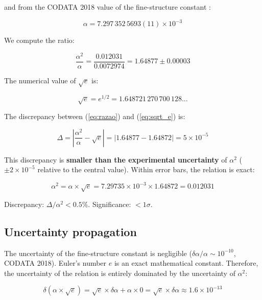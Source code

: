 \documentclass[12pt,a4paper,twoside]{article}
\newcommand{\alphaii}{\alpha^{2}}
\begin{document}
\noindent and from the CODATA 2018 value of the fine-structure constant \cite{CODATA2018}:

\begin{equation}
\alpha = 7.297\,352\,5693(11) \times 10^{-3}
\end{equation}

We compute the ratio:

\begin{equation}
\frac{\alphaii}{\alpha} = \frac{0.012031}{0.0072974} = 1.64877 \pm 0.00003
\label{eq:razao}
\end{equation}

The numerical value of $\sqrt{e}$ is:

\begin{equation}
\sqrt{e} = e^{1/2} = 1.648721\,270\,700\,128\ldots
\label{eq:sqrt_e}
\end{equation}

The discrepancy between (\ref{eq:razao}) and (\ref{eq:sqrt_e}) is:

\begin{equation}
\Delta = \left|\frac{\alphaii}{\alpha} - \sqrt{e}\right| = |1.64877 - 1.64872| = 5 \times 10^{-5}
\end{equation}

This discrepancy is \textbf{smaller than the experimental uncertainty} of $\alphaii$ ($\pm 2 \times 10^{-5}$ relative to the central value). Within error bars, the relation is exact:

\begin{resultbox}[title={Central Result}]
\begin{equation}
\alphaii = \alpha \times \sqrt{e} = 7.29735 \times 10^{-3} \times 1.64872 = 0.012031
\label{eq:resultado_central}
\end{equation}

\noindent Discrepancy: $\Delta/\alphaii < 0.5\%$. Significance: $< 1\sigma$.
\end{resultbox}

\subsection{Uncertainty propagation}

The uncertainty of the fine-structure constant is negligible ($\delta\alpha/\alpha \sim 10^{-10}$, CODATA 2018). Euler's number $e$ is an exact mathematical constant. Therefore, the uncertainty of the relation is entirely dominated by the uncertainty of $\alphaii$:

\begin{equation}
\delta(\alpha \times \sqrt{e}) = \sqrt{e} \times \delta\alpha + \alpha \times 0 = \sqrt{e} \times \delta\alpha \approx 1.6 \times 10^{-13}
\end{equation}
\end{document}
